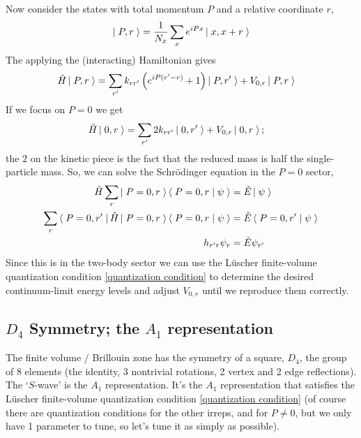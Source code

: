 Now consider the states with total momentum $P$ and a relative coordinate $r$,
\begin{align}
    \left|\;P,r\;\right\rangle = \frac{1}{N_x} \sum_x e^{iPx} \left|\;x,x+r\;\right\rangle
\end{align}
The applying the (interacting) Hamiltonian gives
\begin{align}
    \tilde{H} \left|\;P,r\;\right\rangle
    &=
            \sum_{r'} k_{rr'} \left( e^{iP(r'-r)}+1\right)\left|\;P,r'\;\right\rangle
        +   V_{0,r} \left|\;P,r\;\right\rangle
\end{align}
If we focus on $P=0$ we get
\begin{align}
    \tilde{H} \left|\;0,r\;\right\rangle
    &=
            \sum_{r'} 2k_{rr'} \left|\;0,r'\;\right\rangle
        +   V_{0,r} \left|\;0,r\;\right\rangle;
\end{align}
the $2$ on the kinetic piece is the fact that the reduced mass is half the single-particle mass.
So, we can solve the Schr\"{o}dinger equation in the $P=0$ sector,
\begin{align}
    \tilde{H} \sum_r \left|\;P=0,r\;\right\rangle\left\langle\;P=0,r\;\middle|\;\psi\;\right\rangle &= \tilde{E}\left|\;\psi\;\right\rangle
    \\
    \sum_r \left\langle\;P=0, r'\;\right| \tilde{H} \left|\;P=0,r\;\right\rangle\left\langle\;P=0,r\;\middle|\;\psi\;\right\rangle &= \tilde{E}\left\langle\;P=0,r'\;\middle|\;\psi\;\right\rangle
    \\
    h_{r'r} \psi_r &= \tilde{E} \psi_{r'}
    \label{eq:two-body schrodinger equation}
\end{align}
Since this is in the two-body sector we can use the L\"{u}scher finite-volume quantization condition \eqref{quantization condition} to determine the desired continuum-limit energy levels and adjust $V_{0,r}$ until we reproduce them correctly.


\subsection{$D_4$ Symmetry; the $A_1$ representation}

The finite volume / Brillouin zone has the symmetry of a square, $D_4$, the group of 8 elements (the identity, 3 nontrivial rotations, 2 vertex and 2 edge reflections).  The `$S$-wave' is the $A_1$ representation.
It's the $A_1$ representation that satisfies the L\"{u}scher finite-volume quantization condition \eqref{quantization condition} (of course there are quantization conditions for the other irreps, and for $P\neq 0$, but we only have 1 parameter to tune, so let's tune it as simply as possible).

